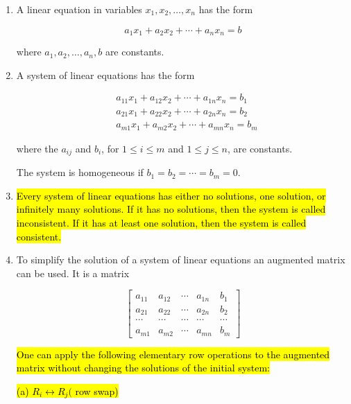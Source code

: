 \documentclass[10pt]{article}
\begin{document}
\begin{enumerate}


\item A linear equation in variables $x_{1}, x_{2}, \ldots, x_{n}$ has the form

$$
a_{1} x_{1}+a_{2} x_{2}+\cdots+a_{n} x_{n}=b
$$

where $a_{1}, a_{2}, \ldots, a_{n}, b$ are constants.

\item A system of linear equations has the form

$$
\begin{aligned}
& a_{11} x_{1}+a_{12} x_{2}+\cdots+a_{1 n} x_{n}=b_{1} \\
& a_{21} x_{1}+a_{22} x_{2}+\cdots+a_{2 n} x_{n}=b_{2} \\
& a_{m 1} x_{1}+a_{m 2} x_{2}+\cdots+a_{m n} x_{n}=b_{m}
\end{aligned}
$$

where the $a_{i j}$ and $b_{i}$, for $1 \leq i \leq m$ and $1 \leq j \leq n$, are constants.

The system is homogeneous if $b_{1}=b_{2}=\cdots=b_{m}=0$.

\item \hl{Every system of linear equations has either no solutions, one solution, or infinitely many solutions. If it has no solutions, then the system is called inconsistent. If it has at least one solution, then the system is called consistent.}

\item To simplify the solution of a system of linear equations an augmented matrix can be used. It is a matrix

$$
\left[\begin{array}{cccc|c}
a_{11} & a_{12} & \cdots & a_{1 n} & b_{1} \\
a_{21} & a_{22} & \cdots & a_{2 n} & b_{2} \\
\cdots & \cdots & \cdots & \cdots & \cdots \\
a_{m 1} & a_{m 2} & \cdots & a_{m n} & b_{m}
\end{array}\right]
$$

\hl{One can apply the following elementary row operations to the augmented matrix without changing the solutions of the initial system:}

\hl{(a) $R_{i} \leftrightarrow R_{j}($ row swap)}


\end{enumerate}
\end{document}
